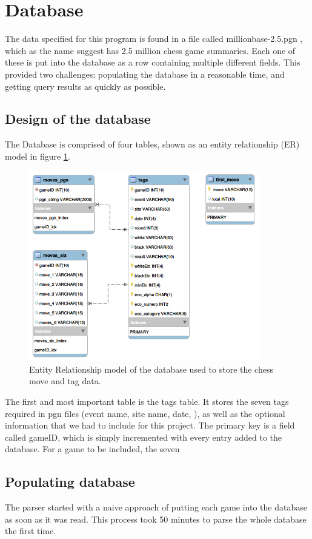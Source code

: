 \documentclass{article}
\begin{document}
\section{Database}
The data specified for this program is found in a file called
millionbase-2.5.pgn \cite{def_db}, which as the name suggest has 2.5 million
chess game summaries. Each one of these is put into the database as a row
containing multiple different fields.  This provided two challenges:
populating the database in a reasonable time, and getting query results as
quickly as possible.

\subsection{Design of the database}
The Database is comprised of four tables, shown as an entity relationship
(ER) model in figure \ref{figure:4}. 

\begin{figure}[h]
	\includegraphics[width=10cm]{EER}
	\caption{Entity Relationship model of the database used to store the
	chess move and tag data.}
	\label{figure:4}
\end{figure}

The first and most important table is the tags table.  It stores the seven
tags required in pgn files (event name, site name, date, 
), as well as the optional information that we had
to include for this project.  The primary key is a field called gameID,
which is simply incremented with every entry added to the database.  For a
game to be included, the seven 


\subsection{Populating database}
The parser started with a naive approach of putting each game into the
database as soon as it was read.  This process took 50 minutes to parse the
whole database the first time.
\end{document}
